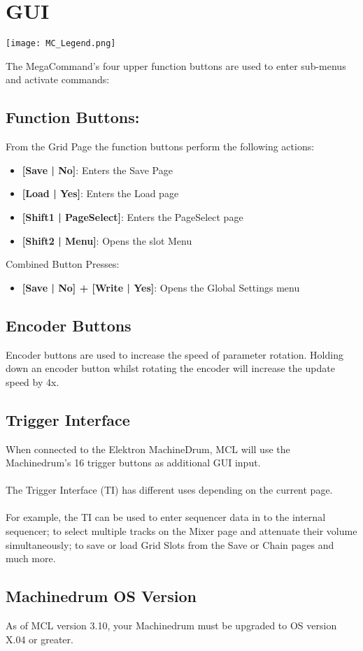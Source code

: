 \chapter{GUI}

\begin{center}
  \texttt{[image: MC\_Legend.png]}
\end{center}

The MegaCommand's four upper function buttons are used to enter sub-menus and activate commands:
\section{Function Buttons:}
From the Grid Page the function buttons perform the following actions:
\begin{itemize}
\item{\textbf{[Save | No]}: Enters the Save Page}
\item{\textbf{[Load | Yes]}: Enters the Load page}
\item{\textbf{[Shift1 | PageSelect]}: Enters the PageSelect page}
\item{\textbf{[Shift2 | Menu]}: Opens the slot Menu }
\end{itemize}
Combined Button Presses:
\begin{itemize}
\item{\textbf{[Save | No] + [Write | Yes]}: Opens the Global Settings menu }
\end{itemize}

\section{Encoder Buttons}
Encoder buttons are used to increase the speed of parameter rotation.
Holding down an encoder button whilst rotating the encoder will increase the update speed by 4x.

\section{Trigger Interface}
When connected to the Elektron MachineDrum, MCL will use the Machinedrum's 16 trigger buttons as additional GUI input. \\
\\
The Trigger Interface (TI) has different uses depending on the current page.\\
\\For example, the TI can be used to enter sequencer data in to the internal sequencer;
to select multiple tracks on the Mixer page and attenuate their volume simultaneously; to save or load Grid Slots from the Save or Chain pages and much more.

\section{Machinedrum OS Version}
As of MCL version 3.10, your Machinedrum must be upgraded to OS version X.04 or greater.

